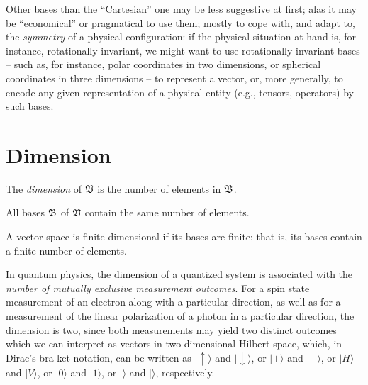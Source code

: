 Other bases than the ``Cartesian'' one may be less suggestive at first; alas it may be ``economical'' or pragmatical to use them;
mostly to cope with, and adapt to, the {\em symmetry} of a physical configuration:
if the physical situation at hand is, for instance, rotationally invariant,
we might want to use rotationally invariant bases --
such as, for instance, polar coordinates in two dimensions, or spherical coordinates in three dimensions --
to represent a vector, or, more generally, to encode any given representation of a physical entity
(e.g., tensors, operators) by such bases.


\section{Dimension}
The {\em dimension}
of $\frak V$ is the number of elements in $\frak B$.

All bases $\frak B$ of $\frak V$ contain the same number of elements.

A vector space is finite dimensional if its bases are finite; that is, its bases
contain a finite number of elements.

{\color{Purple}
In quantum physics, the dimension of a quantized system is associated with
the {\em number of mutually exclusive measurement outcomes}.
For a spin state measurement of an electron
along with a particular direction,
as well as for a measurement of the linear polarization
of a photon in a particular direction,
the dimension is two, since both measurements
may yield two distinct outcomes
which we can
interpret as vectors in two-dimensional Hilbert space,
which, in Dirac's bra-ket notation,\cite{dirac} can be written as
$
\vert \uparrow \rangle$ and $\vert \downarrow \rangle$,
or $\vert + \rangle$ and $
\vert - \rangle
$,
or
$
\vert H \rangle $ and $
\vert V \rangle
$,
or
$
\vert 0 \rangle $ and $
\vert 1 \rangle
$,
or
$
\bigg|$\raisebox{-0.4\height}{\begin{tikzpicture}
    \emoticon\pupils
    \draw[very thick,red,line cap=round] (-1ex,-1ex)
               ..controls (-0.5ex,-1.5ex)and(0.5ex,-1.5ex)..(1ex,-1ex);
    \draw (0.60ex,1.20ex)--(0.60ex,1.60ex)
          (0.85ex,1.25ex)--(0.95ex,1.45ex)
          (1.00ex,1.00ex)--(1.20ex,1.10ex)
          (0.35ex,1.15ex)--(0.25ex,1.35ex)
          (-0.60ex,1.20ex)--(-0.60ex,1.60ex)
          (-0.85ex,1.25ex)--(-0.95ex,1.45ex)
          (-1.00ex,1.00ex)--(-1.20ex,1.10ex)
          (-0.35ex,1.15ex)--(-0.25ex,1.35ex);
\end{tikzpicture}}$\bigg\rangle $ and $
\bigg|$\raisebox{-0.4\height}{\begin{tikzpicture}
\emoticon\pupils
    \fill[shift={( 0.5ex,0.5ex)},rotate=90] (0,0) ellipse (0.3ex and 0.15ex);
    \fill[shift={(-0.5ex,0.5ex)},rotate=90] (0,0) ellipse (0.3ex and 0.15ex);
    \draw[thick] (-1ex,-1ex)..controls
        (-0.5ex,-0.5ex)and(0.5ex,-0.5ex)..(1ex,-1ex);
    \draw[thick] (0.2ex,1.15ex)--(0.5ex,1.6ex)(-0.2ex,1.15ex)--(-0.5ex,1.6ex);
\end{tikzpicture}}$\bigg\rangle
$,
respectively.
}

